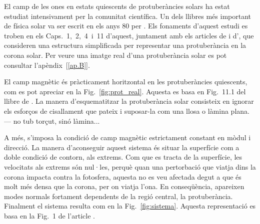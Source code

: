 \documentclass[12pt,a4paper]{article}
\numberwithin{equation}{section}
\begin{document}
El camp de les ones en estats quiescents de protuberàncies solars ha estat estudiat intensivament per la comunitat científica.
Un dels llibres més important de física solar va ser escrit en els anys 80 per \textcite{Priest_2014}.
Els fonaments d'aquest estudi es troben en els Caps.~1,~2,~4~i~11 d'aquest,
juntament amb els articles de \textcite{oscillation_modes_II} i d'\textcite{oscillations_quiescent_solar_prominence},
que consideren una estructura simplificada per representar una protuberància en la corona solar.
Per veure una imatge real d'una protuberància solar es pot consultar l'apèndix~[\ref{ap.B}].




El camp magnètic és pràcticament horitzontal en les protuberàncies quiescents, com es pot apreciar en la Fig.~\ref{fig:prot_real}. Aquesta es basa en Fig.~11.1 del llibre de \textcite{Priest_2014}.
La manera d'esquematitzar la protuberància solar consisteix en ignorar els esforços de cisallament que pateix i suposar-la com una llosa o làmina plana. --- no tub torçut, sinó làmina...

A més, s'imposa la condició de camp magnètic estrictament constant en mòdul i direcció.
La manera d'aconseguir aquest sistema és situar la superfície com a doble condició de contorn, als extrems.
Com que es tracta de la superfície, les velocitats als extrems són nul·les, perquè quan una pertorbació que viatja dins la corona impacta contra la fotosfera,
aquesta no es veu afectada degut a que és molt més densa que la corona, per on viatja l'ona.
En conseqüència, apareixen modes normals fortament dependents de la regió central, la protuberància.
Finalment el sistema resulta com en la Fig.~\ref{fig:sistema}. Aquesta representació es basa en la Fig.~1 de l'article \textcite{oscillation_modes_II}.
\end{document}
